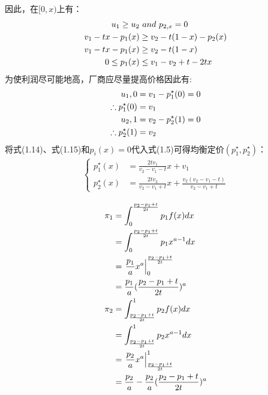 因此，在$[0,x)$上有：
\begin{align}
    u_1 \geq u_2 & \ and \ p_{2,x}=0 \notag \\
    v_1-tx-p_1(x) &\geq v_2-t(1-x)-p_2(x) \notag \\
    v_1-tx-p_1(x) &\geq v_2-t(1-x) \notag \\
   0\leq p_1(x) & \leq v_1-v_2+t-2tx 
\end{align}
为使利润尽可能地高，厂商应尽量提高价格因此有:
\begin{align}
    u_1,0=v_1&-p_1^{\star}(0)=0 \notag \\
    \therefore p_1^{\star}(0) = v_1 \\
    u_2,1=v_2&-p_2^{\star}(1)=0 \notag \\
    \therefore p_2^{\star}(1) = v_2 
\end{align}
将式(1.14)、式(1.15)和$p_i(x)=0$代入式(1.5)可得均衡定价$(p_1^{\star},p_2^{\star})$：
\begin{align}
\begin{cases}
    p_1^{\star}(x) &= \frac{2tv_1}{v_2-v_1-t}x+v_1 \\
    p_2^{\star}(x) &= \frac{2tv_2}{v_2-v_1+t}x+\frac{v_2(v_2-v_1-t)}{v_2-v_1+t}
\end{cases}
\end{align}

\qpart












\begin{align}
    \pi_1 &=\int_0^{\frac{p_2-p_1+t}{2t}} p_1f(x)dx   \notag \\
    &=\int_0^{\frac{p_2-p_1+t}{2t}} p_1 x^{a-1}dx \notag \\
    &=\left.\frac{p_1}{a}x^a \right|_0^{\frac{p_2-p_1+t}{2t}} \notag \\
    &=\frac{p_1}{a}(\frac{p_2-p_1+t}{2t})^a\\
    \pi_2 &=\int_{\frac{p_2-p_1+t}{2t}}^1 p_2f(x)dx  \notag \\
    &=\int_{\frac{p_2-p_1+t}{2t}}^1 p_2 x^{a-1}dx \notag \\
    &=\left.\frac{p_2}{a}x^a \right|_{\frac{p_2-p_1+t}{2t}}^1 \notag \\
    &=\frac{p_2}{a} -\frac{p_2}{a}(\frac{p_2-p_1+t}{2t})^a 
\end{align}

